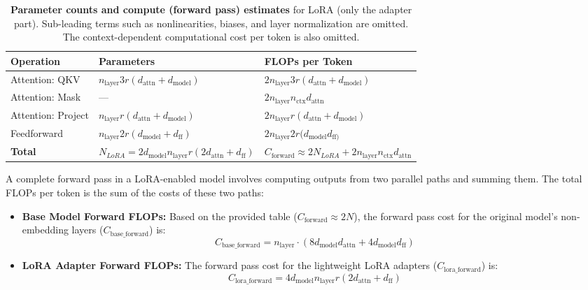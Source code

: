 \documentclass{article} %
\begin{document}
\begin{table}[htbp]
\centering
\renewcommand{\arraystretch}{1.2}
\begin{tabular}{|l|l|l|}
\hline
\textbf{Operation} & \textbf{Parameters} & \textbf{FLOPs per Token} \\ \hline

Attention: QKV & $n_{\text{layer}}3r(d_{\text{attn}} + d_{\text{model}})$ & $2n_{\text{layer}}3r(d_{\text{attn}} + d_{\text{model}})$ \\ \hline
Attention: Mask & --- & $2n_{\text{layer}}n_{\text{ctx}}d_{\text{attn}}$ \\ \hline
Attention: Project & $n_{\text{layer}}r(d_{\text{attn}} + d_{\text{model}})$ & $2n_{\text{layer}}r(d_{\text{attn}} + d_{\text{model}})$ \\ \hline
Feedforward & $n_{\text{layer}} 2r(d_{\text{model}} + d_{\text{ff}})$ & $2n_{\text{layer}}2r(d_{\text{model}}d_{\text{ff})}$ \\ \hline

\textbf{Total} & $N_{LoRA} = 2d_{\text{model}}n_{\text{layer}}r(2d_{\text{attn}} + d_{\text{ff}})$ & $C_{\text{forward}} \approx 2N_{LoRA} + 2n_{\text{layer}}n_{\text{ctx}}d_{\text{attn}}$ \\ \hline
\end{tabular}
\caption{\textbf{Parameter counts and compute (forward pass) estimates} for LoRA (only the adapter part). Sub-leading terms such as nonlinearities, biases, and layer normalization are omitted.  The context-dependent computational cost per token is also omitted.}
\label{tab:flops_table_lora}
\end{table}

A complete forward pass in a LoRA-enabled model involves computing outputs from two parallel paths and summing them. The total FLOPs per token is the sum of the costs of these two paths:

\begin{itemize}

\item \textbf{Base Model Forward FLOPs:}
Based on the provided table ($C_{\text{forward}} \approx 2N$), the forward pass cost for the original model's non-embedding layers ($C_{\text{base\_forward}}$) is:
\begin{equation}
    C_{\text{base\_forward}} = n_{\text{layer}} \cdot (8d_{\text{model}}d_{\text{attn}} + 4d_{\text{model}}d_{\text{ff}})
\end{equation}

\item \textbf{LoRA Adapter Forward FLOPs:}
The forward pass cost for the lightweight LoRA adapters ($C_{\text{lora\_forward}}$) is:
\begin{equation}
    C_{\text{lora\_forward}} = 4d_{\text{model}}n_{\text{layer}}r(2d_{\text{attn}} + d_{\text{ff}})
\end{equation}

\end{itemize}
\end{document}
